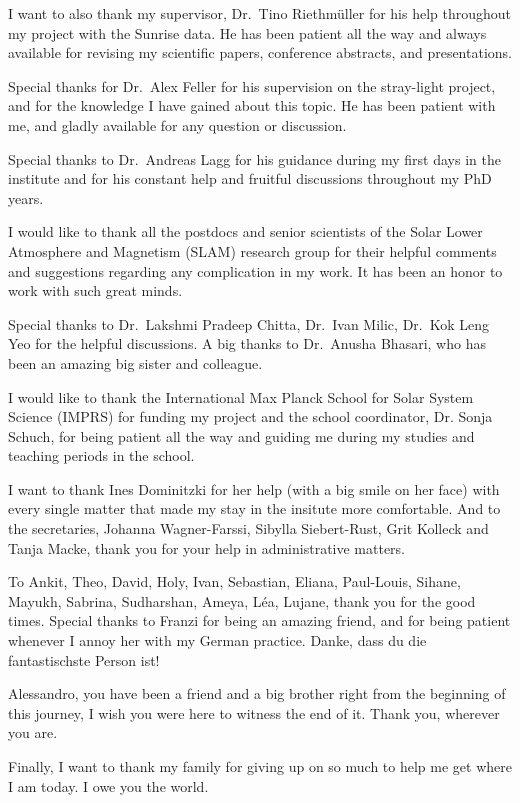 \documentclass[goettingen, gauss, print]{thesis}
\begin{document}
I want to also thank my supervisor, Dr.~Tino Riethm\"uller for his help throughout my project with the Sunrise data. He has been patient all the way and always available for revising my scientific papers, conference abstracts, and presentations.

Special thanks for Dr.~Alex Feller for his supervision on the stray-light project, and for the knowledge I have gained about this topic. He has been patient with me, and gladly available for any question or discussion.

Special thanks to Dr.~Andreas Lagg for his guidance during my first days in the institute and for his constant help and fruitful discussions throughout my PhD years.

I would like to thank all the postdocs and senior scientists of the Solar Lower Atmosphere and Magnetism (SLAM) research group for their helpful comments and suggestions regarding any complication in my work. It has been an honor to work with such great minds.

Special thanks to Dr.~Lakshmi Pradeep Chitta, Dr.~Ivan Milic, Dr.~Kok Leng Yeo for the helpful discussions. A big thanks to Dr.~Anusha Bhasari, who has been an amazing big sister and colleague. 

I would like to thank the International Max Planck School for Solar System Science (IMPRS) for funding my project and the school coordinator, Dr. Sonja Schuch, for being patient all the way and guiding me during my studies and teaching periods in the school. 

I want to thank Ines Dominitzki for her help (with a big smile on her face) with every single matter that made my stay in the insitute more comfortable. And to the secretaries, Johanna Wagner-Farssi, Sibylla Siebert-Rust, Grit Kolleck and Tanja Macke, thank you for your help in administrative matters.


To Ankit, Theo, David, Holy, Ivan, Sebastian, Eliana, Paul-Louis, Sihane, Mayukh, Sabrina, Sudharshan, Ameya, L\'ea, Lujane, thank you for the good times. Special thanks to Franzi for being an amazing friend, and for being patient whenever I annoy her with my German practice. Danke, dass du die fantastischste Person ist!

Alessandro, you have been a friend and a big brother right from the beginning of this journey, I wish you were here to witness the end of it. Thank you, wherever you are.

Finally, I want to thank my family for giving up on so much to help me get where I am today. I owe you the world.\\
\end{document}
